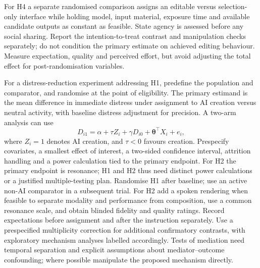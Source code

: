 \documentclass[11pt,a4paper]{article}
\begin{document}
For H4 a separate randomised comparison assigns an editable versus selection-only interface while holding model, input material, exposure time and available candidate outputs as constant as feasible. State agency is assessed before any social sharing. Report the intention-to-treat contrast and manipulation checks separately; do not condition the primary estimate on achieved editing behaviour. Measure expectation, quality and perceived effort, but avoid adjusting the total effect for post-randomisation variables.

For a distress-reduction experiment addressing H1, predefine the population and comparator, and randomise at the point of eligibility. The primary estimand is the mean difference in immediate distress under assignment to AI creation versus neutral activity, with baseline distress adjustment for precision. A two-arm analysis can use
\begin{equation}
D_{i1}=\alpha+\tau Z_i+\gamma D_{i0}+\boldsymbol{\theta}^{\top}X_i+e_i,
\end{equation}
where $Z_i=1$ denotes AI creation, and $\tau<0$ favours creation. Prespecify covariates, a smallest effect of interest, a two-sided confidence interval, attrition handling and a power calculation tied to the primary endpoint. For H2 the primary endpoint is resonance; H1 and H2 thus need distinct power calculations or a justified multiple-testing plan. Randomise H1 after baseline; use an active non-AI comparator in a subsequent trial. For H2 add a spoken rendering when feasible to separate modality and performance from composition, use a common resonance scale, and obtain blinded fidelity and quality ratings. Record expectations before assignment and after the instruction separately. Use a prespecified multiplicity correction for additional confirmatory contrasts, with exploratory mechanism analyses labelled accordingly. Tests of mediation need temporal separation and explicit assumptions about mediator--outcome confounding; where possible manipulate the proposed mechanism directly.
\end{document}
